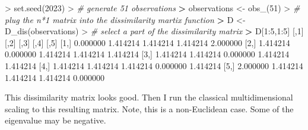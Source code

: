\documentclass[
]{article}
\newenvironment{Shaded}{\begin{snugshade}}{\end{snugshade}}
\newcommand{\CommentTok}[1]{\textcolor[rgb]{0.56,0.35,0.01}{\textit{#1}}}
\newcommand{\DecValTok}[1]{\textcolor[rgb]{0.00,0.00,0.81}{#1}}
\newcommand{\ErrorTok}[1]{\textcolor[rgb]{0.64,0.00,0.00}{\textbf{#1}}}
\newcommand{\FloatTok}[1]{\textcolor[rgb]{0.00,0.00,0.81}{#1}}
\newcommand{\FunctionTok}[1]{\textcolor[rgb]{0.00,0.00,0.00}{#1}}
\newcommand{\NormalTok}[1]{#1}
\newcommand{\OtherTok}[1]{\textcolor[rgb]{0.56,0.35,0.01}{#1}}
\newcommand{\SpecialCharTok}[1]{\textcolor[rgb]{0.00,0.00,0.00}{#1}}
\begin{document}
\begin{Shaded}
\begin{Highlighting}[]
\SpecialCharTok{\textgreater{}} \FunctionTok{set.seed}\NormalTok{(}\DecValTok{2023}\NormalTok{)}
\SpecialCharTok{\textgreater{}} \CommentTok{\# generate 51 observations}
\ErrorTok{\textgreater{}}\NormalTok{ observations }\OtherTok{\textless{}{-}} \FunctionTok{obs\_}\NormalTok{(}\DecValTok{51}\NormalTok{)}
\SpecialCharTok{\textgreater{}} \CommentTok{\# plug the n*1 matrix into the dissimilarity martix function}
\ErrorTok{\textgreater{}}\NormalTok{ D }\OtherTok{\textless{}{-}} \FunctionTok{D\_dis}\NormalTok{(observations)}
\SpecialCharTok{\textgreater{}} \CommentTok{\# select a part of the dissimilarity matrix}
\ErrorTok{\textgreater{}}\NormalTok{ D[}\DecValTok{1}\SpecialCharTok{:}\DecValTok{5}\NormalTok{,}\DecValTok{1}\SpecialCharTok{:}\DecValTok{5}\NormalTok{]}
\NormalTok{         [,}\DecValTok{1}\NormalTok{]     [,}\DecValTok{2}\NormalTok{]     [,}\DecValTok{3}\NormalTok{]     [,}\DecValTok{4}\NormalTok{]     [,}\DecValTok{5}\NormalTok{]}
\NormalTok{[}\DecValTok{1}\NormalTok{,] }\FloatTok{0.000000} \FloatTok{1.414214} \FloatTok{1.414214} \FloatTok{1.414214} \FloatTok{2.000000}
\NormalTok{[}\DecValTok{2}\NormalTok{,] }\FloatTok{1.414214} \FloatTok{0.000000} \FloatTok{1.414214} \FloatTok{1.414214} \FloatTok{1.414214}
\NormalTok{[}\DecValTok{3}\NormalTok{,] }\FloatTok{1.414214} \FloatTok{1.414214} \FloatTok{0.000000} \FloatTok{1.414214} \FloatTok{1.414214}
\NormalTok{[}\DecValTok{4}\NormalTok{,] }\FloatTok{1.414214} \FloatTok{1.414214} \FloatTok{1.414214} \FloatTok{0.000000} \FloatTok{1.414214}
\NormalTok{[}\DecValTok{5}\NormalTok{,] }\FloatTok{2.000000} \FloatTok{1.414214} \FloatTok{1.414214} \FloatTok{1.414214} \FloatTok{0.000000}
\end{Highlighting}
\end{Shaded}

This dissimilarity matrix looks good. Then I run the classical
multidimensional scaling to this resulting matrix. Note, this is a
non-Euclidean case. Some of the eigenvalue may be negative.
\end{document}
